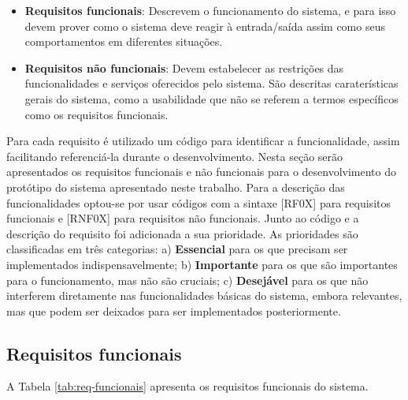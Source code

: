 \begin{itemize}
	\item{\textbf{Requisitos funcionais}: Descrevem o funcionamento do sistema, e para isso devem prover como o sistema deve reagir à entrada/saída assim como seus comportamentos em diferentes situações.}
	
	\item{\textbf{Requisitos não funcionais}: Devem estabelecer as restrições das funcionalidades e serviços oferecidos pelo sistema. São descritas caraterísticas gerais do sistema, como a usabilidade que não se referem a termos específicos como os requisitos funcionais.}
\end{itemize}

Para cada requisito é utilizado um código para identificar a funcionalidade, assim facilitando referenciá-la durante o desenvolvimento. Nesta seção serão apresentados os requisitos funcionais e não funcionais para o desenvolvimento do protótipo do sistema apresentado neste trabalho. Para a descrição das funcionalidades optou-se por usar códigos com a sintaxe [RF0X] para requisitos funcionais e [RNF0X] para requisitos não funcionais. Junto ao código e a descrição do requisito foi adicionada a sua prioridade. As prioridades são classificadas em três categorias: a) \textbf{Essencial} para os que precisam ser implementados indispensavelmente; b) \textbf{Importante} para os que são importantes para o funcionamento, mas não são cruciais; c) \textbf{Desejável} para os que não interferem diretamente nas funcionalidades básicas do sistema, embora relevantes, mas que podem ser deixados para ser implementados posteriormente.

\subsection{Requisitos funcionais}

A Tabela \ref{tab:req-funcionais} apresenta os requisitos funcionais do sistema.


